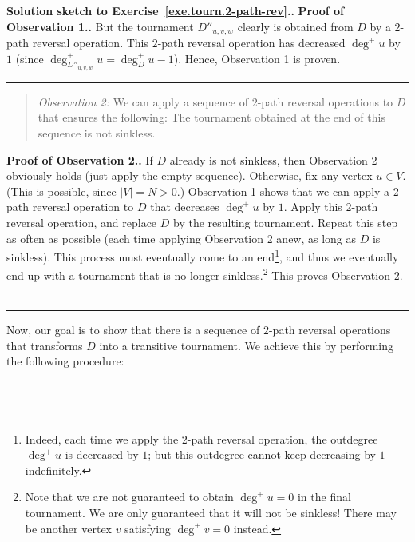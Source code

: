 \documentclass[numbers=enddot,12pt,final,onecolumn,notitlepage]{scrartcl}%
\theoremstyle{definition}
\newenvironment{statement}{\begin{quote}}{\end{quote}}
\newenvironment{proof}[1][Proof]{\noindent\textbf{#1.} }{\ \rule{0.5em}{0.5em}}
\newcommand{\abs}[1]{\left| #1 \right|}
\begin{document}
\begin{proof}[Solution sketch to Exercise~\ref{exe.tourn.2-path-rev}.]
\begin{proof}[Proof of Observation 1.]
But the tournament $D''_{u, v, w}$ clearly is obtained from $D$ by a
$2$-path reversal operation. This $2$-path reversal operation has
decreased $\deg^+ u$ by $1$
(since $\deg^+_{D''_{u, v, w}} u = \deg^+_{D} u - 1$). Hence,
Observation 1 is proven.
\end{proof}

\begin{statement}
\textit{Observation 2:} We can apply a sequence of $2$-path reversal
operations to $D$ that ensures the following: The tournament obtained
at the end of this sequence is not sinkless.
\end{statement}
\begin{proof}[Proof of Observation 2.]
If $D$ already is not sinkless, then Observation 2 obviously holds
(just apply the empty sequence). Otherwise, fix any vertex $u \in V$.
(This is possible, since $\abs{V} = N > 0$.) Observation 1 shows that
we can apply a $2$-path reversal operation to $D$ that decreases
$\deg^+ u$ by $1$. Apply this $2$-path reversal operation, and replace
$D$ by the resulting tournament. Repeat this step as often as
possible (each time applying Observation 2 anew, as long as $D$ is
sinkless). This process must eventually come to an
end\footnote{Indeed, each time we apply the $2$-path reversal
operation, the outdegree $\deg^+ u$ is decreased by $1$; but this
outdegree cannot keep decreasing by $1$ indefinitely.}, and thus we
eventually end up with a tournament that is no longer
sinkless.\footnote{Note that we are not guaranteed to obtain
$\deg^+ u = 0$ in the final tournament. We are only guaranteed that it
will not be sinkless! There may be another vertex $v$ satisfying
$\deg^+ v = 0$ instead.}
This proves Observation 2.
\end{proof}

Now, our goal is to show that there is a sequence of $2$-path reversal
operations that transforms $D$ into a transitive tournament. We
achieve this by performing the following procedure:


\end{proof}
\end{document}
